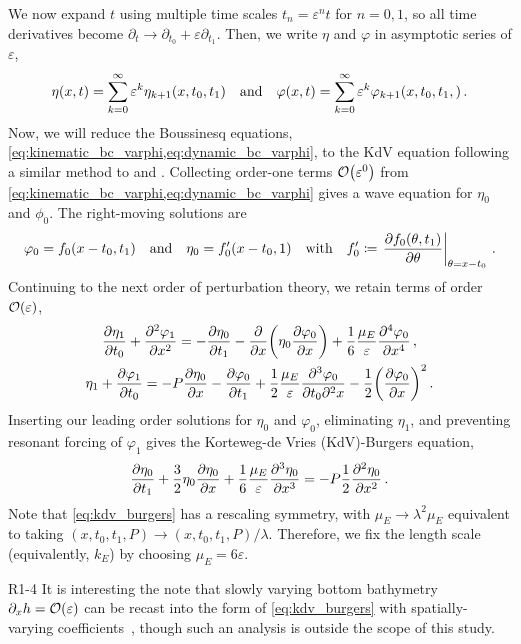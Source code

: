 \documentclass{jfm}
\renewcommand*{\epsilon}{\varepsilon}
\begin{document}
We now expand $t$ using multiple time scales $t_n =
\epsilon^n t$ for $n= 0,1$, so all time derivatives become $\partial_t \to
\partial_{t_0} + \epsilon \partial_{t_1}$.
Then, we write $\eta$ and $\varphi$ in asymptotic series of $\epsilon$,
\begin{equation}
  \eta(x,t) = \sum_{k=0}^{\infty} \epsilon^k
    \eta_{k+1}(x,t_0,t_1) \qq{and}
  \varphi(x,t) = \sum_{k=0}^{\infty} \epsilon^k
    \varphi_{k+1}(x,t_0,t_1,) \,.
\end{equation}
Now, we will reduce the Boussinesq equations,
\cref{eq:kinematic_bc_varphi,eq:dynamic_bc_varphi}, to the KdV equation
following a similar method to \citet{mei2005nonlinear} and
\citet{ablowitz2011nonlinear}.
Collecting order-one terms $\order{\epsilon^0}$ from
\cref{eq:kinematic_bc_varphi,eq:dynamic_bc_varphi} gives
a wave equation for $\eta_0$ and $\phi_0$.
The right-moving solutions are
\begin{equation}
  \varphi_0 = f_0(x-t_0,t_1) \qq{and}
  \eta_0 = f'_0(x-t_0,1) \qq{with}
  f_0' \coloneqq \eval{\pdv{f_0(\theta,t_1)}{\theta}}_{\theta = x-t_0} \,.
\end{equation}
Continuing to the next order of perturbation theory, we retain terms of
order $\order{\epsilon}$,
\begin{gather}
    \pdv{\eta_1}{t_0} + \pdv[2]{\varphi_{1}}{x} =
      -\pdv{\eta_0}{t_1} - \pdv{x} \pqty{\eta_0 \pdv{\varphi_0}{x}} +
      \frac{1}{6} \frac{\mu_E}{\epsilon} \pdv[4]{\varphi_0}{x} \,,
  \\
    \eta_1 + \pdv{\varphi_1}{t_0} = -P \pdv{\eta_0}{x} -\pdv{\varphi_0}{t_1}
      + \frac{1}{2} \frac{\mu_E}{\epsilon} \frac{\partial^3 \varphi_0}
        {\partial t_0 \partial^2 x}
      - \frac{1}{2} \pqty{ \pdv{\varphi_0}{x} }^2
  \,.
\end{gather}
Inserting our leading order solutions for $\eta_0$ and $\varphi_0$,
eliminating $\eta_1$, and preventing resonant forcing of $\varphi_1$
gives the Korteweg-de Vries (KdV)-Burgers equation,
\begin{equation}
  \pdv{\eta_0}{t_1} + \frac{3}{2}
    \eta_0 \pdv{\eta_0}{x} + \frac{1}{6} \frac{\mu_E}{\epsilon}
    \pdv[3]{\eta_0}{x} = -P \frac{1}{2} \pdv[2]{\eta_0}{x} \,.
  \label{eq:kdv_burgers}
\end{equation}
Note that \cref{eq:kdv_burgers} has a rescaling symmetry, with $\mu_E
\to \lambda^2 \mu_E$ equivalent to taking $(x,t_0,t_1,P) \to
(x,t_0,t_1,P)/\lambda$.
Therefore, we fix the length scale (equivalently, $k_E$) by choosing
$\mu_E = 6 \epsilon$.
\begin{LineLabel}{R1-4}
It is interesting the note that slowly varying bottom bathymetry
$\partial_x h = \order{\epsilon}$ can be recast into the form of
\cref{eq:kdv_burgers} with spatially-varying
coefficients~\citep[\eg][]{johnson1972some,ono1972wave}, though such an
analysis is outside the scope of this study.
\end{LineLabel}
\end{document}
